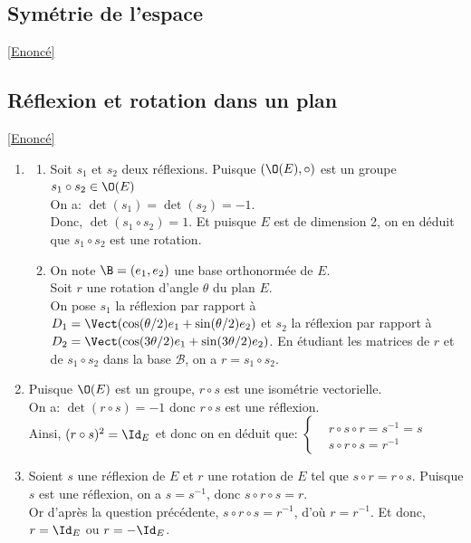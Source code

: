 \documentclass[8pt]{book}
\begin{document}
	\subsection{Symétrie de l'espace}
	\label{Symétrie de l'espace corrigé}
	\textcolor{blue}{\hyperref[Symétrie de l'espace]{[Enoncé]}}\\
	
	\subsection{Réflexion et rotation dans un plan }
	\label{Réflexion et rotation dans un plan corrigé}
		\textcolor{blue}{\hyperref[Réflexion et rotation dans un plan]{[Enoncé]}}\\
	\begin{enumerate}
		\item \begin{enumerate}[label=\alph*.]
			\item Soit $s_1$ et $s_2$ deux réflexions.
			Puisque $(\O(E),\circ)$ est un groupe $s_1\circ s_2\in \O(E)$
			\\On a: $\det(s_1)=\det(s_2)=-1$.
			\\Donc, $\det(s_1\circ s_2)=1$.
			Et puisque $E$ est de dimension 2, on en déduit que $s_1\circ s_2$ est une rotation.
			\item On note $\B=(e_1,e_2)$ une base orthonormée de $E$.
			\\Soit $r$ une rotation d'angle $\theta$ du plan $E$.
			\\On pose $s_1$ la réflexion par rapport à $D_1=\Vect(\cos(\theta/2)e_1
			+\sin(\theta/2)e_2)$ et $s_2$ la réflexion par rapport à $D_2=\Vect(\cos(3\theta/2)e_1
			+\sin(3\theta/2)e_2)$.
			En étudiant les matrices de $r$ et de $s_1\circ s_2$ dans la base $\mathcal{B}$, on a $r=s_1\circ s_2$.
		\end{enumerate}
		\item Puisque $\O(E)$ est un groupe, $r\circ s$ est une isométrie vectorielle.
		\\ On a: $\det(r\circ s)=-1$ donc $r\circ s$ est une réflexion.
		\\ Ainsi, $(r\circ s)^2=\Id_E$ et donc on en déduit que: 
		$\begin{cases}
			&r\circ s\circ r=s^{-1}=s\\
			&s\circ r \circ s=r^{-1}
		\end{cases}$
		\item Soient $s$ une réflexion de $E$ et $r$ une rotation de $E$ tel que $s\circ r=r\circ s$.
		Puisque $s$ est une réflexion, on a $s=s^{-1}$, donc $s\circ r \circ s=r$.
		\\Or d'après la question précédente, $s\circ r \circ s=r^{-1}$, d'où $r=r^{-1}$.
		Et donc, $r=\Id_E$  ou $r=-\Id_E$.
	\end{enumerate}
	
\end{document}
